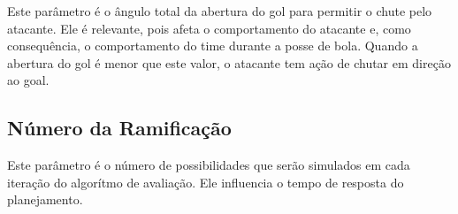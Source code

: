 Este parâmetro é o ângulo total da abertura do gol para permitir o chute pelo
atacante. Ele é relevante, pois afeta o comportamento do atacante e, como
consequência, o comportamento do time durante a posse de bola. Quando a abertura
do gol é menor que este valor, o atacante tem ação de chutar em direção ao goal.


\subsection{Número da Ramificação}

Este parâmetro é o número de possibilidades que serão simulados em cada iteração
do algorítmo de avaliação. Ele influencia o tempo de resposta do planejamento.

